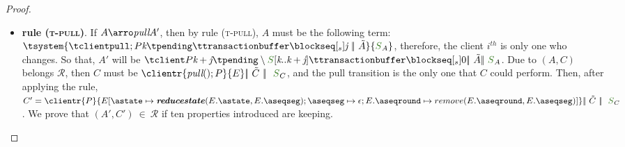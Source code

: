 \begin{proof}
\begin{itemize}
\begin{itemize}
						\item {\bf rule (\textsc{t-pull})}. If $A \arroi{\pulltran} A'$, then by rule (\textsc{\footnotesize{t-pull}}), $A$ must be the following term: $ \tsystem{\tclienti{\tpullins}{\tknown}{\tpending}{\ttransactionbuffer}{\tsent}{\treceivebuffer}\ \bigpar\ \tilde{A}}{\queuemessage_A}$, therefore, the client $i^{th}$ is only one who changes. So that, $A'$ will be $\tclienti{\tprogram}{\tknown+\treceivebuffer}{\tpending \setminus \queuemessage[\tknown .. \tknown + \treceivebuffer]}{\ttransactionbuffer}{\tsent}{0} \bigpar \ \tilde{A} \bigpar\ \queuemessage_A$. Due to $(A,C)$ belongs $\mathcal{R}$, then $C$ must be $\clientr{\pullins}{\stateclient} \bigpar\ \tilde{C} \ \bigpar\ \ \queuemessage_C$, and the pull transition is the only one that $C$ could perform. Then, after applying the rule, $C' = \clientr{P}{\updatethree{E}{\known}{\reducestate{E.\known}{E.\receivebuffer}}{\receivebuffer}{\epsilon}{E.\pending}{\remove{E.\pending}{E.\receivebuffer}}} \bigpar\ \tilde{C} \ \bigpar\ \ \queuemessage_C$. We prove that $(A',C') \ \in \ \mathcal{R}$ if ten properties introduced are keeping.	
						

\end{itemize}
\end{itemize}
\end{proof}
